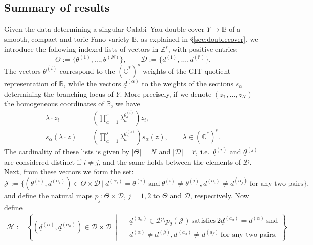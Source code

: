 \documentclass[12pt,a4paper,oneside]{amsart}
\numberwithin{equation}{section}
\theoremstyle{definition}
\theoremstyle{remark}
\begin{document}
\subsection{Summary of results}\label{intro:results}
Given the data determining a singular Calabi--Yau double cover $Y\longrightarrow \mathbb{B}$ of a smooth, compact and toric Fano variety $\mathbb{B}$, as explained in \S\ref{sec:doublecover}, we introduce the following indexed lists of vectors in $\mathbb{Z}^s$, with positive entries:
\begin{equation*}
\Theta:=\{ \underline{\theta}^{(1)},\ldots,\underline{\theta}^{(N)}\},\qquad \mathcal{D}:=\{\underline{d}^{(1)},\ldots,\underline{d}^{(\hat{r})}\} .
\end{equation*}
The vectors $\underline{\theta}^{(i)}$ correspond to the $(\mathbb{C}^{*})^{s}$ weights of the GIT quotient representation of $\mathbb{B}$, while the vectors $\underline{d}^{(\alpha)}$ to the weights of the sections $s_{\alpha}$ determining the branching locus of $Y$. More precisely, if we denote $(z_{1},\ldots,z_N)$ the homogeneous coordinates of $\mathbb{B}$, we have
\begin{equation*}
\begin{aligned}
    \lambda\cdot z_i &= \left(\prod_{a=1}^{s}\lambda_{a}^{\theta^{(i)}_{a}}\right) z_i , \\
    s_{\alpha}(\lambda\cdot z)&=\left(\prod_{a=1}^{s}\lambda_{a}^{d^{(\alpha)}_{a}}\right) s_{\alpha}(z),\qquad \lambda\in(\mathbb{C}^{*})^{s}.
\end{aligned}
\end{equation*}
The cardinality of these lists is given by $|\Theta|=N$ and $|\mathcal{D}|=\hat{r}$, i.e.~$\underline{\theta}^{(i)}$ and $\underline{\theta}^{(j)}$ are considered distinct if $i\neq j$, and the same holds between the elements of $\mathcal{D}$. Next, from these vectors we form the set:
\begin{equation*}
\mathscr{J}:=\{ (\underline{\theta}^{(i)},\underline{d}^{(\alpha_{i})})\in \Theta \times \mathcal{D}~|~\underline{d}^{(\alpha_{i})}=\underline{\theta}^{(i)}~\text{and}~\underline{\theta}^{(i)}\neq \underline{\theta}^{(j)}, \underline{d}^{(\alpha_{i})}\neq \underline{d}^{(\alpha_{j})}~\text{for any two pairs}\} ,
\end{equation*}
and define the natural maps $p_j\colon\Theta \times \mathcal{D}$, $j=1,2$ to $\Theta$ and $\mathcal{D}$, respectively. Now define
\begin{eqnarray*}
\mathscr{H}:=\left\{(\underline{d}^{(\alpha)},\underline{d}^{(a_{\alpha})})\in \mathcal{D}\times  \mathcal{D}~\middle|~
\begin{aligned}
    &\underline{d}^{(a_{\alpha})}\in\mathcal{D}\setminus p_2(\mathscr{J}) ~\text{satisfies}~2\underline{d}^{(a_{\alpha})}=d^{(\alpha)}~\text{and}
    \nonumber\\
    &\underline{d}^{(\alpha)}\neq \underline{d}^{(\beta)},\underline{d}^{(a_{\alpha})}\neq \underline{d}^{(a_{\beta})}~\text{for any two pairs}.
\end{aligned}
\right\}
\end{eqnarray*}
\end{document}
